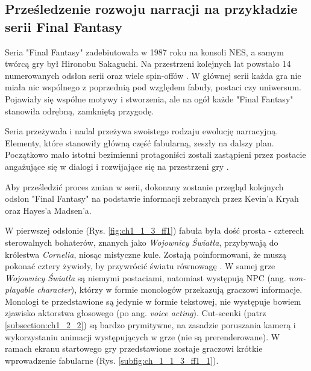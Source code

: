 \subsection{Prześledzenie rozwoju narracji na przykładzie serii Final Fantasy}\label{subsection:ch1_1_3}


Seria "Final Fantasy" zadebiutowała w 1987 roku na konsoli NES, a samym twórcą gry był Hironobu
Sakaguchi. Na przestrzeni kolejnych lat powstało 14 numerowanych odsłon serii oraz wiele spin-offów
\cite{the_evolution_of_final_fantasy}. W głównej serii każda gra nie miała nic wspólnego z poprzednią
pod względem fabuły, postaci czy uniwersum. Pojawiały się wspólne motywy i stworzenia, ale na ogół
każde "Final Fantasy" stanowiła odrębną, zamkniętą przygodę\cite{the_evolution_of_final_fantasy}.

Seria przeżywała i nadal przeżywa swoistego rodzaju ewolucję narracyjną. Elementy, które stanowiły
główną część fabularną, zeszły na dalszy plan. Początkowo mało istotni bezimienni protagoniści zostali
zastąpieni przez postacie angażujące się w dialogi i rozwijające się na przestrzeni gry
\cite{the_evolution_of_final_fantasy}.

Aby prześledzić proces zmian w serii, dokonany zostanie przegląd kolejnych odsłon "Final Fantasy" na
podstawie informacji zebranych przez Kevin'a Kryah\cite{the_evolution_of_final_fantasy} oraz
Hayes'a Madsen'a\cite{25_years_later}.

W pierwszej odsłonie (Rys. \ref{fig:ch1_1_3_ff1}) fabuła była dość prosta - czterech sterowalnych
bohaterów, znanych jako \textit{Wojownicy Światła}, przybywają do królestwa \textit{Cornelia}, niosąc
mistyczne kule. Zostają poinformowani, że muszą pokonać cztery żywioły, by przywrócić światu równowagę
\cite{the_evolution_of_final_fantasy}. W samej grze \textit{Wojownicy Światła} są niemymi postaciami,
natomiast występują NPC (ang. \textit{non-playable character}), którzy w formie monologów przekazują
graczowi informacje. Monologi te przedstawione są jedynie w formie tekstowej, nie występuje bowiem
zjawisko aktorstwa głosowego (po ang. \textit{voice acting}). Cut-scenki (patrz \ref{subsection:ch1_2_2})
są bardzo prymitywne, na zasadzie poruszania kamerą i wykorzystaniu animacji występujących w grze
(nie są prerenderowane). W ramach ekranu startowego gry przedstawione zostaje graczowi krótkie
wprowadzenie fabularne (Rys. \ref{subfig:ch_1_1_3_ff1_1}).

